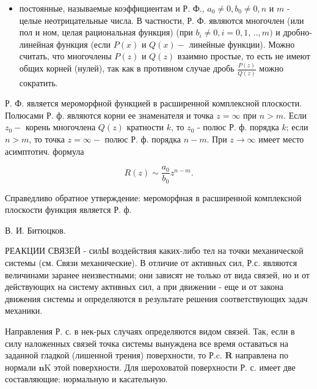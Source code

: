 \documentclass[10pt]{article}
\begin{document}
\begin{itemize}

  \item постоянные, называемые коэффициентам и Р. Ф., $a_{0} \neq 0, b_{0} \neq 0, n$ и $m$ - целые неотрицательные числа. В частности, Р. Ф. являются многочлен (или пол и ном, целая рациональная функция) (при $b_{i} \neq 0, i=0,1$, $. ., m)$ и дробно-линейная функция (если $P(x)$ и $Q(x)-$ линейные функции). Можно считать, что многочлены $P(z)$ и $Q(z)$ взаимно простые, то есть не имеют общих корней (нулей), так как в противном случае дробь $\frac{P(z)}{Q(z)}$ можно сократить.

\end{itemize}



Р. Ф. является мероморфной функцией в расширенной комплексной плоскости. Полюсами Р. ф. являются корни ее знаменателя и точка $z=\infty$ при $n>m$. Если $z_{0}-$ корень многочлена $Q(z)$ кратности $k$, то $z_{0}$ - полюс Р. ф. порядка $k$; если $n>m$, то точка $z=\infty-$ полюс Р. ф. порядка $n-m$. При $z \rightarrow \infty$ имеет место асимптотич. формула



\[

R(z) \sim \frac{a_{0}}{b_{0}} z^{n-m} .

\]



Справедливо обратное утверждение: мероморфная в расширенной комплексной плоскости функция является Р. ф.



В. И. Битюцков.



РЕАКЦИИ СВЯЗЕЙ - силЫ воздействия каких-либо тел на точки механической системы (см. Связи механические). В отличие от активных сил, Р.с. являются величинами заранее неизвестными; они зависят не только от вида связей, но и от действующих на систему активных сил, а при движении - еще и от закона движения системы и определяются в результате решения соответствующих задач механики.



Направления Р. с. в нек-рых случаях определяются видом связей. Так, если в силу наложенных связей точка системы вынуждена все время оставаться на заданной гладкой (лишенной трения) поверхности, то Р.c. $\boldsymbol{R}$ направлена по нормали $\boldsymbol{n} \mathrm{K}$ этой поверхности. Для шероховатой поверхности Р. с. имеет две составляющие: нормальную и касательную.
\end{document}
